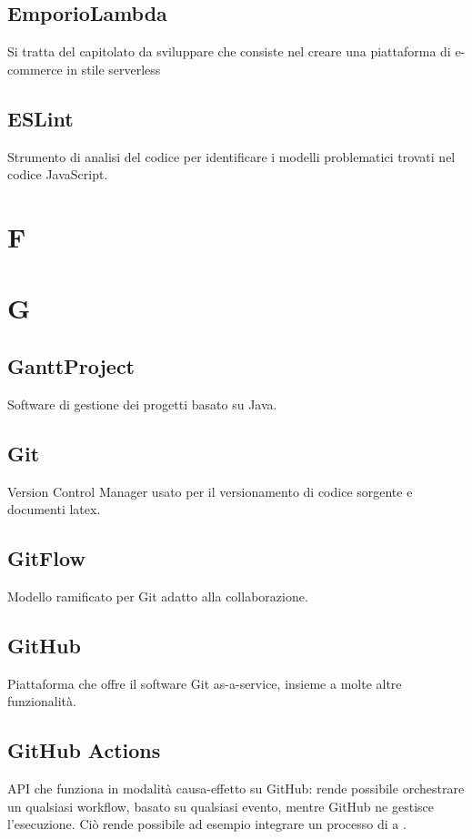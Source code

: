 \subsection*{EmporioLambda}
Si tratta del capitolato da sviluppare che consiste nel creare una piattaforma di e-commerce in stile serverless

\subsection*{ESLint}
Strumento di analisi del codice per identificare i modelli problematici trovati nel codice JavaScript.

\section*{F}


\section*{G}
\subsection*{GanttProject}
Software di gestione dei progetti basato su Java.

\subsection*{Git}
Version Control Manager usato per il versionamento di codice sorgente e documenti latex.

\subsection*{GitFlow}
Modello ramificato per Git adatto alla collaborazione.

\subsection*{GitHub}
Piattaforma che offre il software Git as-a-service, insieme a molte altre funzionalità.

\subsection*{GitHub Actions}
API che funziona in modalità causa-effetto su GitHub: rende possibile orchestrare un qualsiasi workflow, basato su qualsiasi evento, mentre GitHub ne gestisce l’esecuzione. Ciò rende possibile ad esempio integrare un processo di  a .

